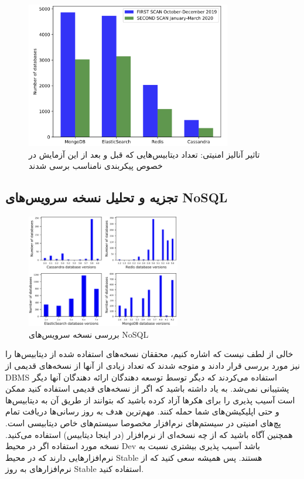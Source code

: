 \documentclass[10pt, a4paper]{article}
\begin{document}
\begin{figure}
    \centering
    \includegraphics[width=0.8\textwidth]{res/fig7.png}
    \caption{تاثیر آنالیز امنیتی: تعداد دیتابیس‌هایی که قبل و بعد از این آزمایش
    در خصوص پیکربندی نامناسب برسی شدند}
    \label{fig: diagram}
\end{figure}

\subsection{تجزیه و تحلیل نسخه سرویس‌های NoSQL}

\begin{figure}
    \centering
    \includegraphics[width=0.6\textwidth]{res/fig8.png}
    \caption{بررسی نسخه سرویس‌های NoSQL}
    \label{fig: diagram}
\end{figure}

خالی از لطف نیست که اشاره کنیم، محققان نسخه‌های استفاده شده از دیتابیس‌ها را نیز
مورد بررسی قرار دادند و متوجه شدند که تعداد زیادی از آنها از نسخه‌های قدیمی از
DBMS استفاده می‌کردند که دیگر توسط توسعه دهندگان ارائه دهندگان آنها دیگر
پشتیبانی نمی‌شد. به یاد داشته باشید که اگر از نسخه‌های قدیمی استفاده کنید ممکن
است آسیب پذیری را برای هکر‌ها آزاد کرده باشید که بتوانند از طریق آن به
دیتابیس‌ها و حتی اپلیکیشن‌های شما حمله کنند. مهم‌ترین هدف به روز رسانی‌ها دریافت
تمام پچ‌های امنیتی در سیستم‌های نرم‌افزار مخصوصا سیستم‌های خاص دیتابیسی است.
همچنین آگاه باشید که از چه نسخه‌ای از نرم‌افزار (در اینجا دیتابیس) استفاده
می‌کنید. نسخه مورد استفاده اگر در محیط Dev باشد آسیب پذیری بیشتری نسبت به
نرم‌افزار‌هایی دارند که در محیط Stable هستند. پس همیشه سعی کنید که از
نرم‌افزار‌های به روز Stable استفاده کنید.
\end{document}
